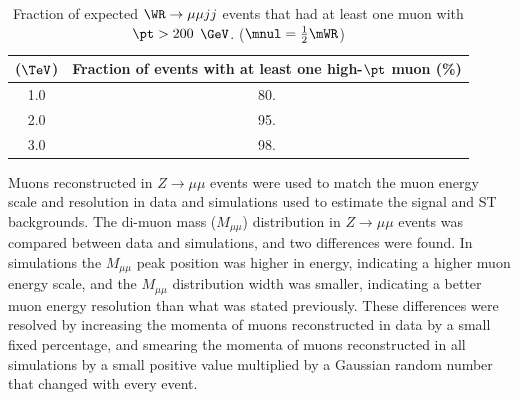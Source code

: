\begin{table}[h]
	\caption{Fraction of expected $\WR \rightarrow \mu\mu jj$ events that had at least one muon with $\pt > 200$ $\GeV$. 
	($\mnul = \frac{1}{2}\mWR$)}
	\label{tab:wrHighPtMuons}
	\centering
	\begin{tabular}{c|c}
		\mWR ($\TeV$) & Fraction of events with at least one high-$\pt$ muon (\%) \\  \hline
		1.0 &  80.  \\
		2.0 &  95.  \\ 
		3.0 &  98.  \\ \hline
	\end{tabular}
\end{table}

Muons reconstructed in $Z \rightarrow \mu\mu$ events were used to match the muon energy scale and resolution in data 
and simulations used to estimate the \WR signal and ST backgrounds.  The di-muon mass ($M_{\mu\mu}$) distribution in 
$Z \rightarrow \mu\mu$ events was compared between data and simulations, and two differences were found.  In simulations 
the $M_{\mu\mu}$ peak position was higher in energy, indicating a higher muon energy scale, and the $M_{\mu\mu}$ distribution width 
was smaller, indicating a better muon energy resolution than what was stated previously.  These differences 
were resolved by increasing the momenta of muons reconstructed in data by a small fixed percentage, and smearing the momenta 
of muons reconstructed in all simulations by a small positive value multiplied by a Gaussian random number that changed 
with every event.



